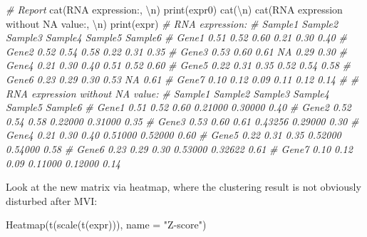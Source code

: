 \documentclass[
  12pt,
]{book}
\newenvironment{Shaded}{\begin{snugshade}}{\end{snugshade}}
\newcommand{\AttributeTok}[1]{\textcolor[rgb]{0.77,0.63,0.00}{#1}}
\newcommand{\CommentTok}[1]{\textcolor[rgb]{0.56,0.35,0.01}{\textit{#1}}}
\newcommand{\FunctionTok}[1]{\textcolor[rgb]{0.00,0.00,0.00}{#1}}
\newcommand{\NormalTok}[1]{#1}
\newcommand{\SpecialCharTok}[1]{\textcolor[rgb]{0.00,0.00,0.00}{#1}}
\newcommand{\StringTok}[1]{\textcolor[rgb]{0.31,0.60,0.02}{#1}}
\begin{document}
\begin{Shaded}
\begin{Highlighting}[]
\CommentTok{\# Report}
\FunctionTok{cat}\NormalTok{(}\StringTok{\textquotesingle{}RNA expression:\textquotesingle{}}\NormalTok{, }\StringTok{\textquotesingle{}}\SpecialCharTok{\textbackslash{}n}\StringTok{\textquotesingle{}}\NormalTok{)}
\FunctionTok{print}\NormalTok{(expr0)}
\FunctionTok{cat}\NormalTok{(}\StringTok{\textquotesingle{}}\SpecialCharTok{\textbackslash{}n}\StringTok{\textquotesingle{}}\NormalTok{)}
\FunctionTok{cat}\NormalTok{(}\StringTok{\textquotesingle{}RNA expression without NA value:\textquotesingle{}}\NormalTok{, }\StringTok{\textquotesingle{}}\SpecialCharTok{\textbackslash{}n}\StringTok{\textquotesingle{}}\NormalTok{)}
\FunctionTok{print}\NormalTok{(expr)}
\CommentTok{\# RNA expression: }
\CommentTok{\#       Sample1 Sample2 Sample3 Sample4 Sample5 Sample6}
\CommentTok{\# Gene1    0.51    0.52    0.60    0.21    0.30    0.40}
\CommentTok{\# Gene2    0.52    0.54    0.58    0.22    0.31    0.35}
\CommentTok{\# Gene3    0.53    0.60    0.61      NA    0.29    0.30}
\CommentTok{\# Gene4    0.21    0.30    0.40    0.51    0.52    0.60}
\CommentTok{\# Gene5    0.22    0.31    0.35    0.52    0.54    0.58}
\CommentTok{\# Gene6    0.23    0.29    0.30    0.53      NA    0.61}
\CommentTok{\# Gene7    0.10    0.12    0.09    0.11    0.12    0.14}
\CommentTok{\# }
\CommentTok{\# RNA expression without NA value: }
\CommentTok{\#       Sample1 Sample2 Sample3 Sample4 Sample5 Sample6}
\CommentTok{\# Gene1    0.51    0.52    0.60 0.21000 0.30000    0.40}
\CommentTok{\# Gene2    0.52    0.54    0.58 0.22000 0.31000    0.35}
\CommentTok{\# Gene3    0.53    0.60    0.61 0.43256 0.29000    0.30}
\CommentTok{\# Gene4    0.21    0.30    0.40 0.51000 0.52000    0.60}
\CommentTok{\# Gene5    0.22    0.31    0.35 0.52000 0.54000    0.58}
\CommentTok{\# Gene6    0.23    0.29    0.30 0.53000 0.32622    0.61}
\CommentTok{\# Gene7    0.10    0.12    0.09 0.11000 0.12000    0.14}
\end{Highlighting}
\end{Shaded}

Look at the new matrix via heatmap, where the clustering result is not obviously disturbed after MVI:

\begin{Shaded}
\begin{Highlighting}[]
\FunctionTok{Heatmap}\NormalTok{(}\FunctionTok{t}\NormalTok{(}\FunctionTok{scale}\NormalTok{(}\FunctionTok{t}\NormalTok{(expr))), }\AttributeTok{name =} \StringTok{"Z{-}score"}\NormalTok{)}
\end{Highlighting}
\end{Shaded}
\end{document}
